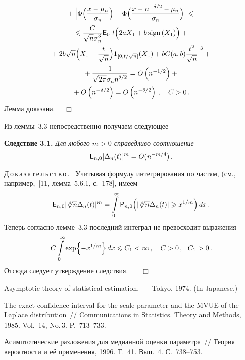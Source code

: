 \begin{multicols}{2}
\begin{multline}
{}+
\Bigl|\Phi\Bigl(\fr{x - \mu_n}{\sigma_n}\Bigr)-
\Phi\Bigl(\fr{x-n^{-\delta/2}-\mu_n}{\sigma_n}\Bigr)\Bigr|\le{}\\
{}
\le \fr{C}{\sqrt{n}\sigma_n^{3}}{\e}_0\Bigl|
t\Bigl(2aX_1+ b\, \mathrm{sign}\left(X_1\right)\Bigr)+{}\\
{}+
2b\sqrt{n}\Bigl(X_1- \fr{t}{\sqrt{n}}\Bigr)
{\IT_{[0,t/\sqrt{n}]}}(X_1)+bC(a,b)\fr{t^2}{\sqrt{n}}
\Bigr|^3+{}\\
{}+ \fr{1}{\sqrt{2\pi}\sigma_nn^{\delta/2}}= 
O\left(n^{-1/2}\right)+{}\\
{}+
O\left(n^{-\delta/2}\right) =O\left(n^{-\delta/2}\right)\,,\quad
C > 0\,. 
\label{e3.27}
\end{multline}
Лемма доказана. \ \ $\Box$

\smallskip

Из леммы~3.3 непосредственно получаем следующее

\smallskip

\noindent
\textbf{Следствие 3.1.} {\it
Для любого $m > 0$ справедливо соотношение
$$
{\e}_{n,0} |\Delta_n(t)|^m = O(n^{-m/4})\,.
$$
}

\smallskip

\noindent
Д\,о\,к\,а\,з\,а\,т\,е\,л\,ь\,с\,т\,в\,о\,. \
Учитывая формулу интегрирования по частям, (см., например,~[11,  лемма~5.6.1, с.~178], имеем
$$
{\e}_{n,0} |\sqrt[{4}]{n}\Delta_n(t)|^m = \int\limits_0^\infty
{\p}_{n,0}\Bigl(|\sqrt[{4}]{n}\Delta_n(t)| \ge x^{1/m}\Bigr)\,dx\,.
$$
Теперь согласно лемме~3.3 последний интеграл не превосходит выражения
$$
C \int\limits_0^\infty \exp\Bigl\{-x^{1/m}\Bigr\}\,dx \le C_1
< \infty\,, \quad C > 0\,, \ \ C_1 > 0\,.
$$
Отсюда следует утверждение следствия. \ \ \ $\Box$


{\small\frenchspacing
{%
\begin{thebibliography}{99}    

Asymptotic theory of statistical estimation.~---  Tokyo, 1974. (In Japanese.)

The exact confidence interval for 
the scale parameter and the MVUE of the Laplace distribution~// 
Communications in Statistics. Theory and Methods, 1985. Vol.~14, No.\,3. 
P.~713--733.

Асимптотические разложения для 
медианной оценки параметра~// Теория вероятности и её
применения, 1996. Т.~41. Вып.~4. С.~738--753.


\end{thebibliography}}}
\end{multicols}
